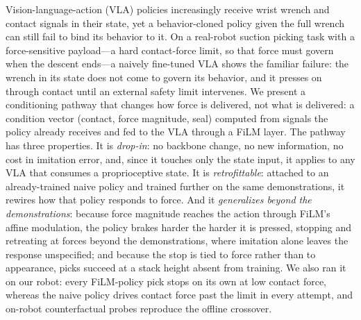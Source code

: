 Vision-language-action (VLA) policies increasingly receive wrist wrench and contact signals in
their state, yet a behavior-cloned policy given the full wrench can still fail to bind its
behavior to it. On a real-robot suction picking task with a force-sensitive payload---a hard
contact-force limit, so that force must govern when the descent ends---a naively fine-tuned
VLA shows the familiar failure: the wrench in its state does not come to govern its behavior,
and it presses on through contact until an external safety limit intervenes. We present a conditioning pathway that changes how force is delivered, not what is
delivered: a condition vector \chat{} (contact, force magnitude, seal) computed from signals the
policy already receives and fed to the VLA through a FiLM layer. The pathway has three
properties. It is \emph{drop-in}: no backbone change, no new information, no cost in imitation
error, and, since it touches only the state input, it applies to any VLA that consumes a
proprioceptive state. It is
\emph{retrofittable}: attached to an already-trained naive policy and trained further on the
same demonstrations, it rewires how that policy responds to force. And it \emph{generalizes
beyond the demonstrations}: because force magnitude reaches the action through FiLM's affine
modulation, the policy brakes
harder the harder it is pressed, stopping and retreating at forces beyond the demonstrations,
where imitation alone leaves the response unspecified; and because the stop is tied to force
rather than to appearance, picks succeed at a stack height absent from training. We also ran it on our robot: every
FiLM-policy pick stops on its own at low contact force, whereas the naive policy drives contact
force past the limit in every attempt, and on-robot counterfactual probes reproduce the offline
crossover.
